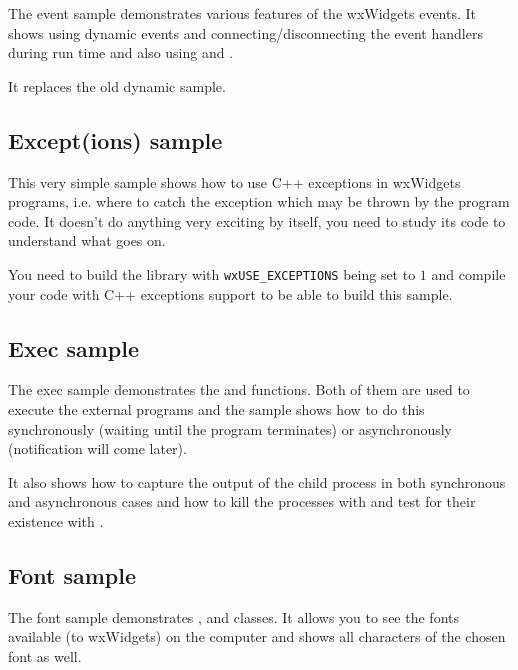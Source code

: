 The event sample demonstrates various features of the wxWidgets events. It
shows using dynamic events and connecting/disconnecting the event handlers
during run time and also using
 and
.

It replaces the old dynamic sample.


\subsection{Except(ions) sample}\label{sampleexcept}

This very simple sample shows how to use C++ exceptions in wxWidgets programs,
i.e. where to catch the exception which may be thrown by the program code. It
doesn't do anything very exciting by itself, you need to study its code to
understand what goes on.

You need to build the library with \texttt{wxUSE\_EXCEPTIONS} being set to $1$
and compile your code with C++ exceptions support to be able to build this
sample.


\subsection{Exec sample}\label{sampleexec}

The exec sample demonstrates the  and
 functions. Both of them are used to execute the
external programs and the sample shows how to do this synchronously (waiting
until the program terminates) or asynchronously (notification will come later).

It also shows how to capture the output of the child process in both
synchronous and asynchronous cases and how to kill the processes with
 and test for their existence with
.


\subsection{Font sample}\label{samplefont}

The font sample demonstrates ,
 and
 classes. It allows you to see the fonts
available (to wxWidgets) on the computer and shows all characters of the
chosen font as well.


